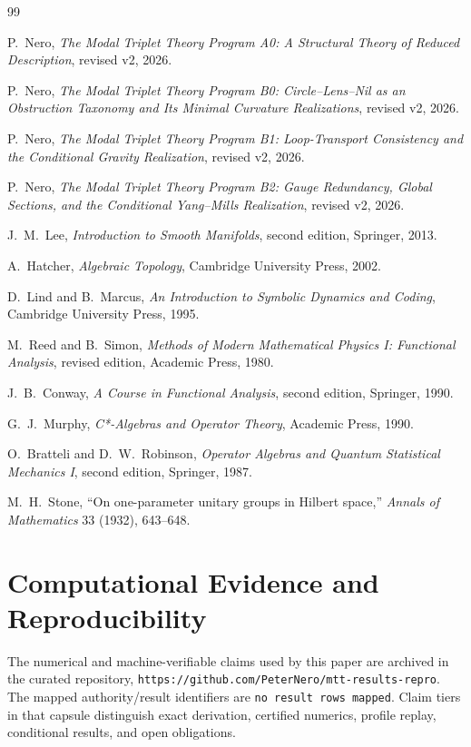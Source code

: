 \documentclass[11pt]{article}
\begin{document}
\begin{thebibliography}{99}

P.~Nero,
\newblock \emph{The Modal Triplet Theory Program A0: A Structural Theory of
Reduced Description}, revised v2, 2026.

P.~Nero,
\newblock \emph{The Modal Triplet Theory Program B0: Circle--Lens--Nil as an
Obstruction Taxonomy and Its Minimal Curvature Realizations},
revised v2, 2026.

P.~Nero,
\newblock \emph{The Modal Triplet Theory Program B1: Loop-Transport
Consistency and the Conditional Gravity Realization},
revised v2, 2026.

P.~Nero,
\newblock \emph{The Modal Triplet Theory Program B2: Gauge Redundancy, Global
Sections, and the Conditional Yang--Mills Realization},
revised v2, 2026.

J.~M.~Lee,
\newblock \emph{Introduction to Smooth Manifolds}, second edition,
Springer, 2013.

A.~Hatcher,
\newblock \emph{Algebraic Topology},
Cambridge University Press, 2002.

D.~Lind and B.~Marcus,
\newblock \emph{An Introduction to Symbolic Dynamics and Coding},
Cambridge University Press, 1995.

M.~Reed and B.~Simon,
\newblock \emph{Methods of Modern Mathematical Physics I: Functional
Analysis}, revised edition,
Academic Press, 1980.

J.~B.~Conway,
\newblock \emph{A Course in Functional Analysis}, second edition,
Springer, 1990.

G.~J.~Murphy,
\newblock \emph{C*-Algebras and Operator Theory},
Academic Press, 1990.

O.~Bratteli and D.~W.~Robinson,
\newblock \emph{Operator Algebras and Quantum Statistical Mechanics I},
second edition,
Springer, 1987.

M.~H.~Stone,
\newblock ``On one-parameter unitary groups in Hilbert space,''
\emph{Annals of Mathematics} 33 (1932), 643--648.

\end{thebibliography}

\section*{Computational Evidence and Reproducibility}
The numerical and machine-verifiable claims used by this paper are archived in the curated repository, \texttt{https://github.com/PeterNero/mtt-results-repro}. The mapped authority/result identifiers are \texttt{no result rows mapped}. Claim tiers in that capsule distinguish exact derivation, certified numerics, profile replay, conditional results, and open obligations.
\end{document}

